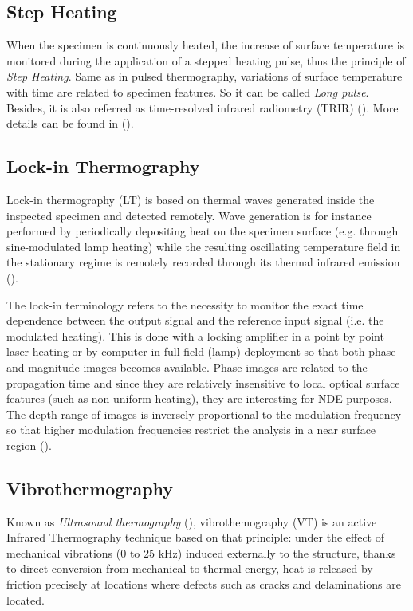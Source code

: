 \subsection{Step Heating}
When the specimen is  continuously heated, the increase of surface temperature is monitored during the application of a stepped heating pulse, thus the principle of \textit{Step Heating}. Same as in pulsed thermography, variations of surface temperature with time are related to specimen features. So it can be called \textit{Long pulse}. Besides, it is also referred as  time-resolved  infrared radiometry (TRIR) (\citet{spicer1992time}).  More details can be found in (\citet{ibarra2013infrared,osiander1998thermal}).

\subsection{Lock-in Thermography}
Lock-in thermography (LT) is based on thermal waves generated inside the inspected specimen and detected remotely. Wave generation is for instance performed by periodically depositing heat on the specimen surface (e.g. through sine-modulated lamp heating) while the resulting oscillating temperature field in the stationary regime is remotely recorded through its thermal infrared emission (\citet{wu1998lock}).

The lock-in terminology refers to the necessity to monitor the exact time dependence between the output signal and the reference input signal (i.e. the modulated heating). This is done with a locking amplifier in a point by point laser heating or by computer in full-field (lamp) deployment so that both phase and magnitude images becomes available. Phase images are related to the propagation time and since they are relatively insensitive to local optical surface features (such as non uniform heating), they are interesting for NDE purposes. The depth range of images is inversely proportional to the modulation frequency so that higher modulation frequencies restrict the analysis in a near surface region (\citet{Maldague2001theory}).

\subsection{Vibrothermography}
Known as \textit{Ultrasound thermography} (\citet{dillenz2001progress}), vibrothemography (VT) is an active Infrared Thermography technique based on that principle: under the effect of mechanical vibrations (0 to 25 kHz) induced externally to the structure, thanks to direct conversion from mechanical to thermal energy, heat is released by friction precisely at locations where defects such as cracks and delaminations are located.

